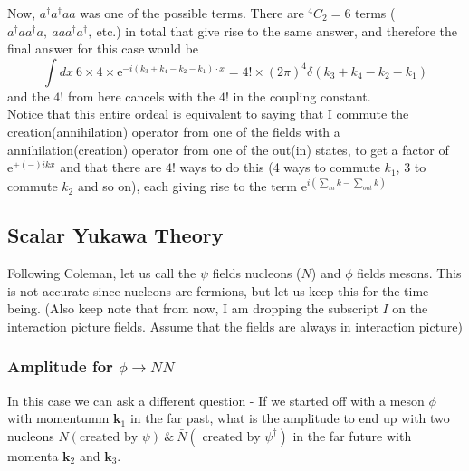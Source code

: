 \documentclass[11pt, notitlepage]{report}
\newcommand{\e}{\mathrm{e}}
\numberwithin{equation}{section}
\begin{document}
{        Now, \(a^\dagger a^\dagger a a\) was one of the possible terms. There are \({}^4C_2 = 6\) terms (\(a^\dagger a a^\dagger a,~aaa^\dagger a^\dagger,~\)etc.) in total that give rise to the same answer, and therefore the final answer for this case would be 
        \begin{equation*}
            \int dx ~6\times 4\times \e^{-i(k_3 + k_4 - k_2 - k_1)\cdot x} = 4! \times (2\pi)^4 \delta(k_3 + k_4 - k_2 - k_1)
        \end{equation*}
        and the \(4!\) from here cancels with the \(4!\) in the coupling constant. \\
        Notice that this entire ordeal is equivalent to saying that I commute the creation(annihilation) operator from one of the fields with a annihilation(creation) operator from one of the out(in) states, to get a factor of \(\e^{+(-)ikx}\) and that there are \(4!\) ways to do this (4 ways to commute \(k_1\), 3 to commute \(k_2\) and so on), each giving rise to the term \(\e^{i(\sum_{in}k - \sum_{out}k)}\)
    }

    \subsection{Scalar Yukawa Theory}
    Following Coleman, let us call the \(\psi\) fields nucleons (\(N\)) and \(\phi\) fields mesons. This is not accurate since nucleons are fermions, but let us keep this for the time being. (Also keep note that from now, I am dropping the subscript \(I\) on the interaction picture fields. Assume that the fields are always in interaction picture)
    
    \subsubsection{Amplitude for \(\phi\to N\bar{N}\)}
    In this case we can ask a different question - If we started off with a meson \(\phi\) with momentumm \(\textbf{k}_1\) in the far past, what is the amplitude to end up with two nucleons \(N (\text{created by }\psi)~\&~\bar{N} (\text{ created by }\psi^\dagger)\) in the far future with momenta \(\textbf{k}_2\) and \(\textbf{k}_3\). \\
\end{document}
